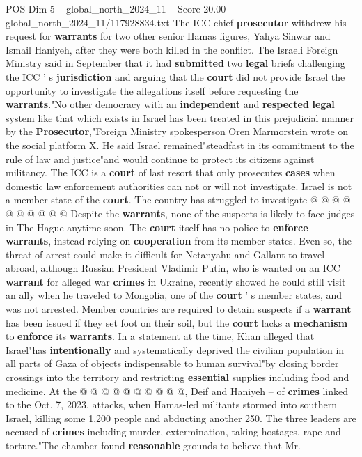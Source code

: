 \begin{textsample}{POS Dim 5 – global\_north\_2024\_11 – Score 20.00 – global\_north\_2024\_11/117928834.txt}
The ICC chief \textbf{prosecutor} withdrew his request for \textbf{warrants} for two other senior Hamas figures, Yahya Sinwar and Ismail Haniyeh, after they were both killed in the conflict.
The Israeli Foreign Ministry said in September that it had \textbf{submitted} two \textbf{legal} briefs challenging the ICC ' s \textbf{jurisdiction} and arguing that the \textbf{court} did not provide Israel the opportunity to investigate the allegations itself before requesting the \textbf{warrants}."No other democracy with an \textbf{independent} and \textbf{respected} \textbf{legal} system like that which exists in Israel has been treated in this prejudicial manner by the \textbf{Prosecutor},"Foreign Ministry spokesperson Oren Marmorstein wrote on the social platform X.
He said Israel remained"steadfast in its commitment to the rule of law and justice"and would continue to protect its citizens against militancy.
The ICC is a \textbf{court} of last resort that only prosecutes \textbf{cases} when domestic law enforcement authorities can not or will not investigate.
Israel is not a member state of the \textbf{court}.
The country has struggled to investigate @ @ @ @ @ @ @ @ @ @ Despite the \textbf{warrants}, none of the suspects is likely to face judges in The Hague anytime soon.
The \textbf{court} itself has no police to \textbf{enforce} \textbf{warrants}, instead relying on \textbf{cooperation} from its member states.
Even so, the threat of arrest could make it difficult for Netanyahu and Gallant to travel abroad, although Russian President Vladimir Putin, who is wanted on an ICC \textbf{warrant} for alleged war \textbf{crimes} in Ukraine, recently showed he could still visit an ally when he traveled to Mongolia, one of the \textbf{court} ' s member states, and was not arrested.
Member countries are required to detain suspects if a \textbf{warrant} has been issued if they set foot on their soil, but the \textbf{court} lacks a \textbf{mechanism} to \textbf{enforce} its \textbf{warrants}.
In a statement at the time, Khan alleged that Israel"has \textbf{intentionally} and systematically deprived the civilian population in all parts of Gaza of objects indispensable to human survival"by closing border crossings into the territory and restricting \textbf{essential} supplies including food and medicine.
At the @ @ @ @ @ @ @ @ @ @, Deif and Haniyeh -- of \textbf{crimes} linked to the Oct. 7, 2023, attacks, when Hamas-led militants stormed into southern Israel, killing some 1,200 people and abducting another 250.
The three leaders are accused of \textbf{crimes} including murder, extermination, taking hostages, rape and torture."The chamber found \textbf{reasonable} grounds to believe that Mr.

\end{textsample}
